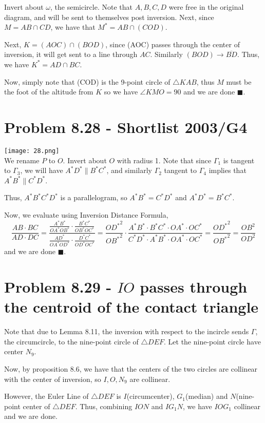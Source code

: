 \documentclass[11pt]{scrartcl}
\begin{document}
Invert about $\omega$, the semicircle. Note that $A,B,C,D$ were free in the original diagram, and will be sent to themselves post inversion. Next, since $M=AB\cap CD$, we have that $M^* = AB\cap (COD)$. 

Next, $K=(AOC)\cap (BOD)$, since (AOC) passes through the center of inversion, it will get sent to a line through $AC$. Similarly $(BOD)\to \overline{BD}$. Thus, we have $K^* = AD\cap BC$.

Now, simply note that (COD) is the 9-point circle of $\triangle KAB$, thus $M$ must be the foot of the altitude from $K$ so we have $\angle KMO=90$ and we are done $\blacksquare$.

\section{Problem 8.28 - Shortlist 2003/G4}
\texttt{[image: 28.png]}\\
We rename $P$ to $O$. Invert about $O$ with radius 1. Note that since $\Gamma_1$ is tangent to $\Gamma_3$, we will have $A^*D^*\parallel B^* C^*$, and similarly $\Gamma_2$ tangent to $\Gamma_4$ implies that $A^*B^*\parallel C^* D^*$.

Thus, $A^*B^*C^*D^*$ is a parallelogram, so $A^*B^*=C^*D^*$ and $A^*D^*=B^*C^*$.

Now, we evaluate using Inversion Distance Formula,
\[\frac{AB\cdot BC}{AD\cdot DC} = \frac{\frac{A^*B^*}{OA^*OB^*}\cdot \frac{B^*C^*}{OB^*OC^*}}{\frac{AD^*}{OA^*OD^*}\cdot \frac{D^*C^*}{OD^*OC^*}} = \frac{{OD^*}^2}{{OB^*}^2}\cdot \frac{A^*B^*\cdot B^*C^* \cdot OA^*\cdot OC^* }{C^*D^*\cdot A^*B^*\cdot OA^*\cdot OC^*} = \frac{{OD^*}^2}{{OB^*}^2}= \frac{OB^2}{OD^2}\]
and we are done $\blacksquare$.

\section{Problem 8.29 - $IO$ passes through the centroid of the contact triangle}
Note that due to Lemma 8.11, the inversion with respect to the incircle sends $\Gamma$, the circumcircle,  to the nine-point circle of $\triangle DEF$.  Let the nine-point circle have center $N_9$.

Now, by proposition $8.6$, we have that the centers of the two circles are collinear with the center of inversion, so $I,O,N_9$ are collinear.

However, the Euler Line of $\triangle DEF$ is $I$(circumcenter), $G_1$(median) and $N$(nine-point center of $\triangle DEF$. Thus, combining $ION$ and $IG_1N$, we have $IOG_1$ collinear and we are done.
\end{document}
